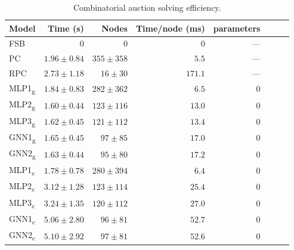 \begin{scriptsize}
\begin{table}[ht]
	\centering
	\begin{tabular}{lrrrrrrr}
	    \toprule
		Model & Time (s) & Nodes  & Time/node (ms) & parameters \\
		\midrule
		FSB & 0 & 0 & 0 & --- \\
		PC  & $1.96 \pm 0.84$ & $355 \pm 358$ & $5.5$ & ---\\
		RPC & $2.73 \pm 1.18$ & $16 \pm 30$ & $ 171.1$ & ---\\
		\addlinespace
		MLP1\textsubscript{g} & $1.84 \pm 0.83$ & $282 \pm 362$ & $6.5$  & 0\\
		MLP2\textsubscript{g} & $1.60 \pm 0.44$ & $123 \pm 116$ & $13.0$ & 0\\
		MLP3\textsubscript{g} & $1.62 \pm 0.45$ & $121 \pm 112$ & $13.4$ & 0\\
		GNN1\textsubscript{g} & $1.65 \pm 0.45$ & $97 \pm 85$   & $17.0$ & 0\\
		GNN2\textsubscript{g} & $1.63 \pm 0.44$ & $95 \pm 80$   & $17.2$ & 0\\
		\addlinespace
		MLP1\textsubscript{c} & $1.78 \pm 0.78$ & $280 \pm 394$ & $6.4$  & 0\\
		MLP2\textsubscript{c} & $3.12 \pm 1.28$ & $123 \pm 114$ & $25.4$ & 0\\
		MLP3\textsubscript{c} & $3.24 \pm 1.35$ & $120 \pm 112$ & $27.0$ & 0\\
		GNN1\textsubscript{c} & $5.06 \pm 2.80$ & $96 \pm 81$   & $52.7$ & 0\\
		GNN2\textsubscript{c} & $5.10 \pm 2.92$ & $97 \pm 81$   & $52.6$ & 0\\
		\bottomrule
	\end{tabular}
	\caption{Combinatorial auction solving efficiency.}\label{tab:results1_cauction}
\end{table}


\end{scriptsize}

